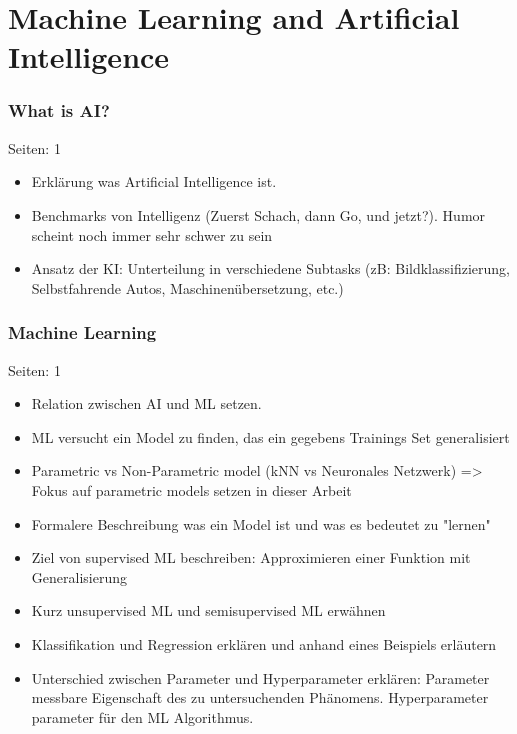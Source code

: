 \documentclass[draft,final,oneside]{vutinfth} %
\begin{document}
\section{Machine Learning and Artificial Intelligence}

\subsubsection{What is AI?}
Seiten: 1
\begin{itemize}

\item Erklärung was Artificial Intelligence ist.
\item Benchmarks von Intelligenz (Zuerst Schach, dann Go, und jetzt?). Humor scheint noch immer sehr schwer zu sein
\item Ansatz der KI: Unterteilung in verschiedene Subtasks (zB: Bildklassifizierung, Selbstfahrende Autos, Maschinenübersetzung, etc.)

\end{itemize}

\subsubsection{Machine Learning}
Seiten: 1
\begin{itemize}

\item Relation zwischen AI und ML setzen.
\item ML versucht ein Model zu finden, das ein gegebens Trainings Set generalisiert
\item Parametric vs Non-Parametric model (kNN vs Neuronales Netzwerk) => Fokus auf parametric models setzen in dieser Arbeit
\item Formalere Beschreibung was ein Model ist und was es bedeutet zu "lernen"
\item Ziel von supervised ML beschreiben: Approximieren einer Funktion mit Generalisierung
\item Kurz unsupervised ML und semisupervised ML erwähnen
\item Klassifikation und Regression erklären und anhand eines Beispiels erläutern
\item Unterschied zwischen Parameter und Hyperparameter erklären: Parameter messbare Eigenschaft des zu untersuchenden Phänomens. Hyperparameter parameter für den ML Algorithmus.

\end{itemize}
\end{document}
